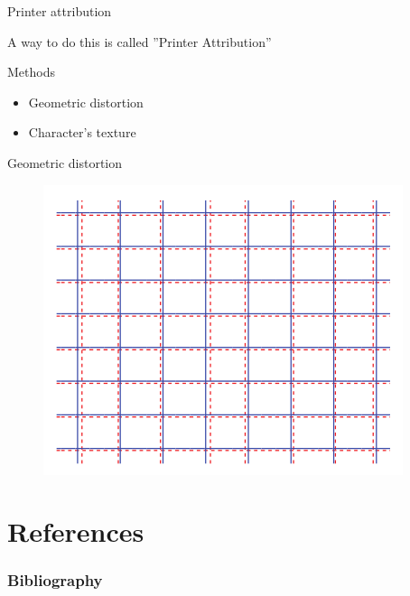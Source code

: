 \documentclass[notes]{beamer}
\begin{document}
\begin{frame}

\begin{block}{Printer attribution}

A way to do this is called ''Printer Attribution''

\end{block}

\begin{block}{Methods}

\begin{itemize}

\item Geometric distortion

\item Character's texture

\end{itemize}

\end{block}

\end{frame}

\begin{frame}

\begin{block}{Geometric distortion}

\begin{figure}[!htb]
\centering
\includegraphics[scale=0.35]{geometric_distortion}
\label{fig:geometric_distortion}
\end{figure}

\end{block}

\end{frame}

\section{References}
\begin{frame} %

\frametitle{Bibliography}




\end{frame}
\end{document}

